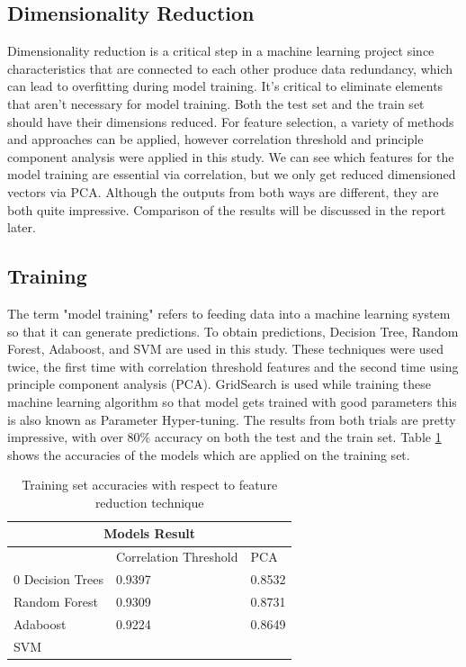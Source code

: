 \documentclass[12pt]{article}
\begin{document}
\subsection{Dimensionality Reduction}
Dimensionality reduction is a critical step in a machine learning project since characteristics that are connected to each other produce data redundancy, which can lead to overfitting during model training. It's critical to eliminate elements that aren't necessary for model training. Both the test set and the train set should have their dimensions reduced. For feature selection, a variety of methods and approaches can be applied, however correlation threshold and principle component analysis were applied in this study. We can see which features for the model training are essential via correlation, but we only get reduced dimensioned vectors via PCA. Although the outputs from both ways are different, they are both quite impressive. Comparison of the results will be discussed in the report later. 

\subsection{Training}
The term "model training" refers to feeding data into a machine learning system so that it can generate predictions. To obtain predictions, Decision Tree, Random Forest, Adaboost, and SVM are used in this study. These techniques were used twice, the first time with correlation threshold features and the second time using principle component analysis (PCA). GridSearch is used while training these machine learning algorithm so that model gets trained with good parameters this is also known as Parameter Hyper-tuning. The results from both trials are pretty impressive, with over 80$\%$ accuracy on both the test and the train set. Table \ref{table:accuracies} shows the accuracies of the models which are applied on the training set.

\begin{table}[h!]
	\centering
\begin{tabular}{ |p{3cm}|p{3cm}|p{3cm}|  }
	\hline
	\multicolumn{3}{|c|}{Models Result} \\
	\hline
	& Correlation Threshold & PCA \\0
	\hline
	Decision Trees & 0.9397 &0.8532 \\
	Random Forest & 0.9309   & 0.8731 \\
	Adaboost &0.9224 & 0.8649 \\
	SVM    & &  \\
	\hline
\end{tabular}
\caption{Training set accuracies with respect to feature reduction technique}
\label{table:accuracies}
\end{table}
\end{document}
